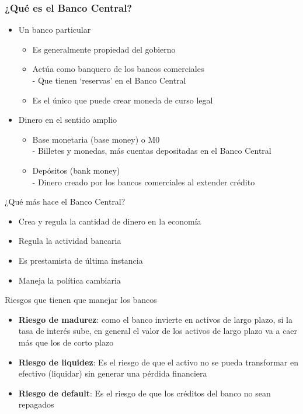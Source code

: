 \documentclass{beamer}
\begin{document}
\begin{frame}
\frametitle{¿Qué es el Banco Central?}
\begin{itemize}
    \item Un banco particular
        \begin{itemize}
            \item Es generalmente propiedad del gobierno
            \item Actúa como banquero de los bancos comerciales \\
            - Que tienen `reservas' en el Banco Central
            \item Es el único que puede crear moneda de curso legal
        \end{itemize}
    \item Dinero en el sentido amplio
        \begin{itemize}
            \item Base monetaria (base money) o M0 \\
            - Billetes y monedas, más cuentas depositadas en el Banco Central
            \item Depósitos (bank money) \\
            - Dinero creado por los bancos comerciales al extender crédito
        \end{itemize}
\end{itemize}
\end{frame}

\begin{frame}{¿Qué más hace el Banco Central?}
    \begin{itemize}
    \item Crea y regula la cantidad de dinero en la economía
    \vspace{1mm}
    \item Regula la actividad bancaria
    \vspace{1mm}
    \item Es prestamista de última instancia
    \vspace{1mm}
    \item Maneja la política cambiaria 
\end{itemize}
\end{frame}

\begin{frame}{Riesgos que tienen que manejar los bancos}
\begin{itemize}
    \item \textbf{Riesgo de madurez}: como el banco invierte en activos de largo plazo, si la tasa de interés sube, en general el valor de los activos de largo plazo va a caer más que los de corto plazo \vspace{1mm}
    \item \textbf{Riesgo de liquidez}: Es el riesgo de que el activo no se pueda transformar en efectivo (liquidar) sin generar una pérdida financiera \vspace{1mm}
    \item \textbf{Riesgo de default}: Es el riesgo de que los créditos del banco no sean repagados
\end{itemize}
    \end{frame}
\end{document}
